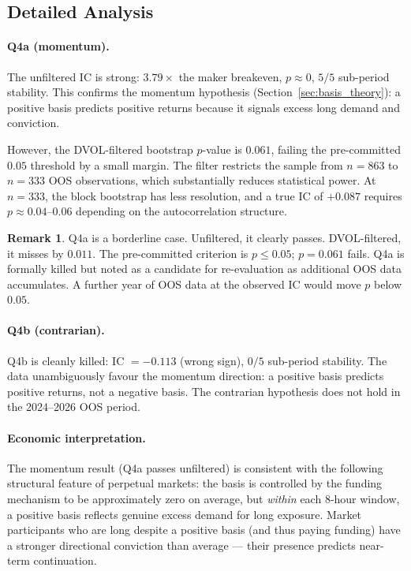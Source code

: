 \documentclass[12pt, a4paper]{article}
\theoremstyle{plain}
\theoremstyle{definition}
\newtheorem{remark}{Remark}[section]
\begin{document}
\subsection{Detailed Analysis}

\paragraph{Q4a (momentum).}
The unfiltered IC is strong: $3.79\times$ the maker breakeven, $p \approx 0$,
$5/5$ sub-period stability.  This confirms the momentum hypothesis
(Section~\ref{sec:basis_theory}): a positive basis predicts positive returns
because it signals excess long demand and conviction.

However, the DVOL-filtered bootstrap $p$-value is $0.061$, failing the
pre-committed $0.05$ threshold by a small margin.  The filter restricts
the sample from $n = 863$ to $n = 333$ OOS observations, which substantially
reduces statistical power.  At $n = 333$, the block bootstrap has less
resolution, and a true IC of $+0.087$ requires $p \approx 0.04$--$0.06$
depending on the autocorrelation structure.

\begin{remark}
  Q4a is a borderline case.  Unfiltered, it clearly passes.  DVOL-filtered,
  it misses by $0.011$.  The pre-committed criterion is $p \leq 0.05$;
  $p = 0.061$ fails.  Q4a is formally killed but noted as a candidate
  for re-evaluation as additional OOS data accumulates.  A further year
  of OOS data at the observed IC would move $p$ below $0.05$.
\end{remark}

\paragraph{Q4b (contrarian).}
Q4b is cleanly killed: IC $= -0.113$ (wrong sign), $0/5$ sub-period
stability.  The data unambiguously favour the momentum direction: a
positive basis predicts positive returns, not a negative basis.  The
contrarian hypothesis does not hold in the 2024--2026 OOS period.

\paragraph{Economic interpretation.}
The momentum result (Q4a passes unfiltered) is consistent with the
following structural feature of perpetual markets: the basis is
controlled by the funding mechanism to be approximately zero on average,
but \emph{within} each 8-hour window, a positive basis reflects genuine
excess demand for long exposure.  Market participants who are long despite
a positive basis (and thus paying funding) have a stronger directional
conviction than average --- their presence predicts near-term continuation.
\end{document}
